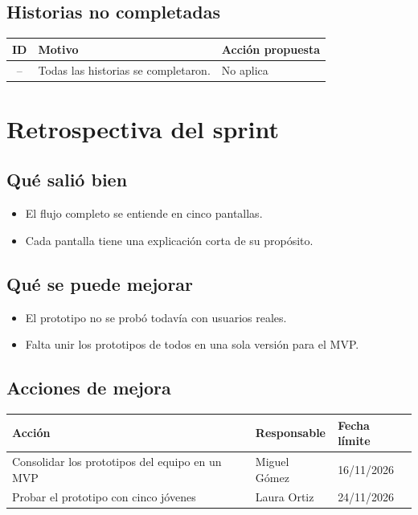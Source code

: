 \documentclass[11pt,a4paper]{article}
\begin{document}
\subsection{Historias no completadas}
\begin{tabularx}{\textwidth}{c X X}
  \toprule
  \textbf{ID} & \textbf{Motivo} & \textbf{Acción propuesta} \\
  \midrule
  -- & Todas las historias se completaron. & No aplica \\
  \bottomrule
\end{tabularx}

\section{Retrospectiva del sprint}

\subsection{Qué salió bien}
\begin{itemize}[leftmargin=1.5em]
  \item {El flujo completo se entiende en cinco pantallas.}
  \item {Cada pantalla tiene una explicación corta de su propósito.}
\end{itemize}

\subsection{Qué se puede mejorar}
\begin{itemize}[leftmargin=1.5em]
  \item {El prototipo no se probó todavía con usuarios reales.}
  \item {Falta unir los prototipos de todos en una sola versión para el MVP.}
\end{itemize}

\subsection{Acciones de mejora}
\begin{tabularx}{\textwidth}{X l l}
  \toprule
  \textbf{Acción} & \textbf{Responsable} & \textbf{Fecha límite} \\
  \midrule
  Consolidar los prototipos del equipo en un MVP & Miguel Gómez & 16/11/2026 \\
  Probar el prototipo con cinco jóvenes & Laura Ortiz & 24/11/2026 \\
  \bottomrule
\end{tabularx}
\end{document}
